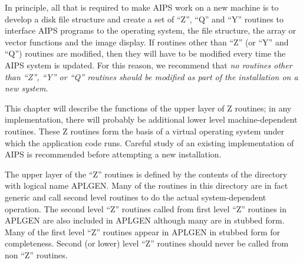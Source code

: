 In principle, all that is required to make AIPS work on a new machine
is to develop a disk file structure and create a set of ``Z'', ``Q'' and
``Y'' routines to interface AIPS programs to the operating system, the
file structure, the array or vector functions and the image display.
If routines other than ``Z'' (or ``Y'' and ``Q'') routines are modified,
then they will have to be modified every time the AIPS system is
updated.  For this reason, we recommend that {\it no routines other than
``Z'', ``Y'' or ``Q'' routines should be modified as part of the
installation on a new system}.

This chapter will describe the functions of the upper layer of Z
routines; in any implementation, there will probably be additional
lower level machine-dependent routines.  These Z routines form the
basis of a virtual operating system under which the application code
runs. Careful study of an existing implementation of AIPS is
recommended before attempting a new installation.

The upper layer of the ``Z'' routines is defined by the contents of
the directory with logical name APLGEN.  Many of the routines in this
directory are in fact generic and call second level routines to do the
actual system-dependent operation.  The second level ``Z'' routines
called from first level ``Z'' routines in APLGEN are also included in
APLGEN although many are in stubbed form.  Many of the first level
``Z'' routines appear in APLGEN in stubbed form for completeness.
Second (or lower) level ``Z'' routines should never be called from non
``Z'' routines.


